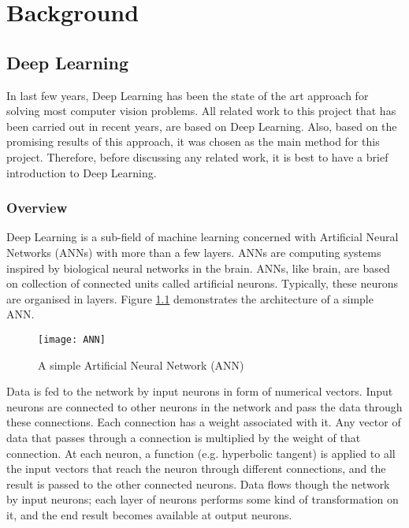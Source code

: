 \chapter{Background}
\label{Background}

\section{Deep Learning}
In last few years, Deep Learning has been the state of the art approach for solving most computer vision problems. All related work to this project that has been carried out in recent years, are based on Deep Learning. Also, based on the promising results of this approach, it was chosen as the main method for this project. Therefore, before discussing any related work, it is best to have a brief introduction to Deep Learning. 

\subsection{Overview} \label{sec:bgoverview}
Deep Learning is a sub-field of machine learning concerned with Artificial Neural Networks (ANNs) with more than a few layers. ANNs are computing systems inspired by biological neural networks in the brain. ANNs, like brain, are based on collection of connected units called artificial neurons. Typically, these neurons are organised in layers. Figure \ref{fig:ANN} demonstrates the architecture of a simple ANN.

\begin{figure}
    \centering
    \texttt{[image: ANN]}
    \caption{A simple Artificial Neural Network (ANN) }
    \label{fig:ANN}
\end{figure}

Data is fed to the network by input neurons in form of numerical vectors. Input neurons are connected to other neurons in the network and pass the data through these connections. Each connection has a weight associated with it. Any vector of data that passes through a connection is multiplied by the weight of that connection. At each neuron, a function (e.g. hyperbolic tangent) is applied to all the input vectors that reach the neuron through different connections, and the result is passed to the other connected neurons. Data flows though the network by input neurons; each layer of neurons performs some kind of transformation on it, and the end result becomes available at output neurons.

